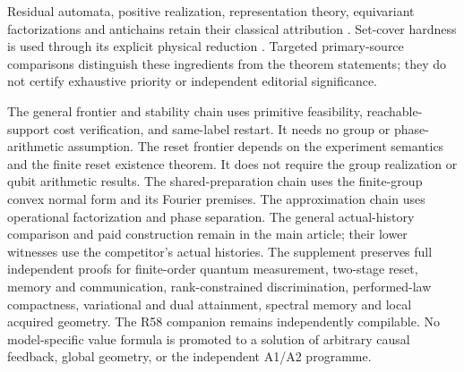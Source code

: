 Residual automata, positive realization, representation theory,
equivariant factorizations and antichains retain their classical
attribution \cite{RabinScott59,Rabin63,Heller65,CarlylePaz71,
BenvenutiFarina04,Schwarz64,Flor69,Serre77,GPT13,VandaeleGillisGlineur17}.
Set-cover hardness is used through its explicit physical reduction
\cite{Karp72}.  Targeted primary-source comparisons distinguish these
ingredients from the theorem statements; they do not certify
exhaustive priority or independent editorial significance.

The general frontier and stability chain uses primitive feasibility,
reachable-support cost verification, and same-label restart.  It needs
no group or phase-arithmetic assumption.  The reset frontier depends
on the experiment semantics and the finite
reset existence theorem.  It does not require the group realization or
qubit arithmetic results.  The shared-preparation chain uses the
finite-group convex normal form and its Fourier premises.  The
approximation chain uses operational factorization and phase separation.
The general actual-history comparison and paid construction remain in
the main article; their lower witnesses use the competitor's actual
histories.  The supplement preserves full independent proofs for
finite-order quantum measurement, two-stage reset, memory and
communication, rank-constrained discrimination, performed-law
compactness, variational and dual attainment, spectral memory and local
acquired geometry.  The R58 companion remains independently compilable.
No model-specific value formula is promoted to a solution of arbitrary
causal feedback, global geometry, or the independent A1/A2 programme.
